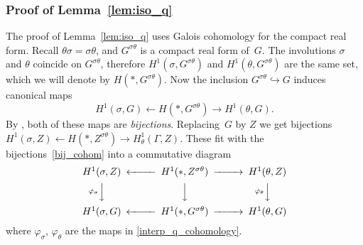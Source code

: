 \documentclass[10pt,leqno]{article}
\newcommand{\ad}{\mathrm{ad}}
\newcommand{\Gad}{G_\mathrm{ad}}
\begin{document}

 

\subsubsection{Proof of Lemma~\ref{lem:iso_q}}

The proof of Lemma~\ref{lem:iso_q} uses Galois cohomology for the compact real form.  Recall $\theta\sigma = \sigma\theta$, and $G^{\sigma\theta}$ is a compact real form of~$G$. 
The involutions $\sigma$ and $\theta$ coincide on $G^{\sigma\theta}$,
therefore  $H^1(\sigma, G^{\sigma\theta})$ and  $H^1(\theta, G^{\sigma\theta})$ are the same set,
which we will denote by  $H(\ast, G^{\sigma\theta})$.
Now the inclusion $G^{\sigma\theta} \hookrightarrow G$ induces canonical maps 
\begin{equation} \label{bij_cohom} H^{1}(\sigma,  G) \longleftarrow H(\ast, G^{\sigma\theta}) \longrightarrow H^{1}(\theta,  G).\end{equation}
By \cite[Corollary~4.4 and Corollary 4.7]{galois}, both of these maps are \emph{bijections}.
Replacing~$G$ by $Z$ we get bijections $H^{1}(\sigma, Z) \leftarrow H(\ast, Z^{\sigma\theta}) \rightarrow H^{1}_{\theta}(\Gamma, Z)$.
These fit with the bijections~\eqref{bij_cohom} into a commutative diagram
\[
\begin{CD}
H^{1}(\sigma, Z) @<<< H^1(\ast, Z^{\sigma\theta})@>>> H^{1}(\theta, Z)
 \\
@V{\varphi_{\sigma}}VV @VVV @V{\varphi_{\theta}}VV  \\
H^{1}(\sigma, G) @<<< H^1(\ast, G^{\sigma\theta})@>>> H^{1}(\theta,  G)
\end{CD}
\]
where $\varphi_\sigma$, $\varphi_\theta$ are the maps in \eqref{interp_q_cohomology}.
\end{document}

